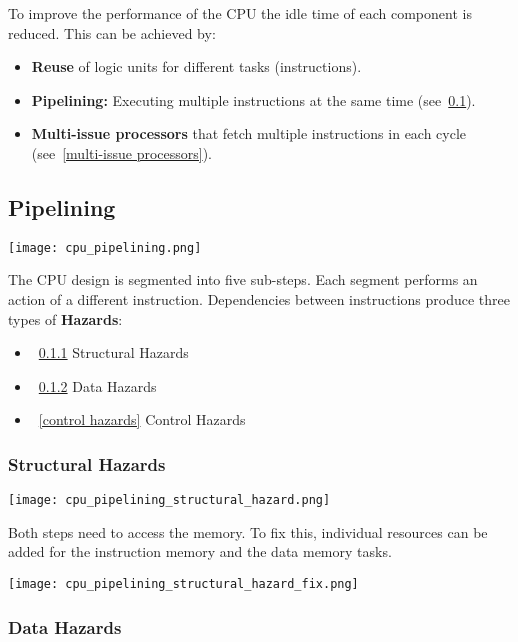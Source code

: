 \begin{multicols*}{3}
    To improve the performance of the CPU the idle time of each component is reduced. This can be achieved by:

    \begin{itemize}
        \item \textbf{Reuse} of logic units for different tasks (instructions).
        \item \textbf{Pipelining:} Executing multiple instructions at the same time (see~\ref{pipelining}).
        \item \textbf{Multi-issue processors} that fetch multiple instructions in each cycle (see~\ref{multi-issue processors}).
    \end{itemize}

    \subsection{Pipelining}\label{pipelining}

    \texttt{[image: cpu\_pipelining.png]}

    The CPU design is segmented into five sub-steps. Each segment performs an action of a different instruction.
    \newpar{}
    Dependencies between instructions produce three types of \textbf{Hazards}:
    \begin{itemize}
        \item~\ref{structural hazards} Structural Hazards
        \item~\ref{data hazards} Data Hazards
        \item~\ref{control hazards} Control Hazards
    \end{itemize}

    \subsubsection{Structural Hazards}\label{structural hazards}

    \texttt{[image: cpu\_pipelining\_structural\_hazard.png]}

    Both steps need to access the memory. To fix this, individual resources can be added for the instruction memory and the data memory tasks.

    \begin{center}
        \texttt{[image: cpu\_pipelining\_structural\_hazard\_fix.png]}
    \end{center}

    \subsubsection{Data Hazards}\label{data hazards}


\end{multicols*}
